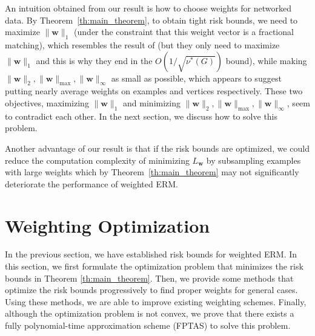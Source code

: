 \documentclass[letterpaper]{article} %
\def\LongVersion{}
\def\LongVersionEnd{}
\newcommand{\weight}{\mathbf{w}}
\newcommand{\empiricalrisk}[1]{L_{#1}}
\newcommand{\normo}[1]{\|#1\|_1}
\begin{document}
An intuition obtained from our result is how to choose weights for networked data. By Theorem~\ref{th:main_theorem}, to obtain tight risk bounds, we need to maximize $\normo{\weight{}}$ (under the constraint that this weight vector is a fractional matching), which resembles the result of \cite{wang2017learning} (but they only need to maximize $\normo{\weight{}}$ and this is why they end in the $O(1/\sqrt{\nu^*(G)})$ bound), while making $\|\weight{}\|_2,\|\weight{}\|_\max,\|\weight{}\|_\infty$ as small as possible, which appears to suggest putting nearly average weights on examples and vertices respectively. These two objectives, maximizing $\normo{\weight{}}$ and minimizing $\|\weight{}\|_2,\|\weight{}\|_\max,\|\weight{}\|_\infty$, seem to contradict each other. In the next section, we discuss how to solve this problem.  


\LongVersion
Another advantage of our result is that if the risk bounds are optimized, we could reduce the computation complexity of minimizing $\empiricalrisk{\weight{}}$ by subsampling examples with large weights which by Theorem~\ref{th:main_theorem} may not significantly deteriorate the performance of weighted ERM.
\LongVersionEnd

\section{Weighting Optimization} %
\label{sec:weighting_scheme}

In the previous section, we have established risk bounds for weighted ERM. In this section, we first formulate the optimization problem that minimizes the risk bounds in Theorem \ref{th:main_theorem}. 
Then, we provide some methods that optimize the risk bounds progressively %
to find proper weights for general cases. 
Using these methods, we are able to improve existing weighting schemes.
Finally, although the optimization problem is not convex, we prove that there exists a fully polynomial-time approximation scheme (FPTAS) to solve this problem.
\end{document}
